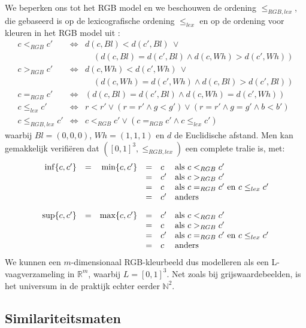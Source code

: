We beperken ons tot het RGB model en we beschouwen de ordening $\leq_{RGB,lex}$, die
gebaseerd is op de lexicografische ordening $\leq_{lex}$ en op de ordening voor kleuren in het 
RGB model uit \cite{dewitte:vect_morph_ops}:
$$
\begin{array}{rcl}
c <_{RGB} c' & \iff & d(c,Bl) < d(c',Bl)\ \lor \\
			   &	  & \quad(d(c,Bl) = d(c',Bl) \land d(c,Wh) > d(c',Wh)) \\[5pt]
c >_{RGB} c' & \iff & d(c,Wh) < d(c',Wh)\ \lor \\
			   &	  & \quad(d(c,Wh) = d(c',Wh) \land d(c,Bl) > d(c',Bl)) \\[5pt]
c =_{RGB} c'   & \iff & (d(c,Bl) = d(c',Bl) \land d(c,Wh) = d(c',Wh)) \\[10pt]
c \leq_{lex} c' & \iff & r < r' \lor (r = r' \land g < g') \lor (r = r' \land g = g' \land b < b') \\[10pt]
c \leq_{RGB,lex} c' & \iff & c <_{RGB} c' \lor (c =_{RGB} c' \land c \leq_{lex} c')
\end{array}
$$
waarbij $Bl = (0,0,0)$, $Wh = (1,1,1)$ en $d$ de Euclidische afstand.
Men kan gemakkelijk verifi\"eren dat $([0,1]^3,\leq_{RGB,lex})$ een complete tralie is, met:
$$
\begin{array}{@{}c@{}}
\begin{array}{rcrcll}
\inf \{c,c'\} & = & \min \{c,c'\} & = & c & \textrm{als } c <_{RGB} c' \\
		  	& & & = & c' & \textrm{als } c >_{RGB} c' \\
		  	& & & = & c & \textrm{als } c =_{RGB} c' \textrm{ en } c \leq_{lex} c' \\
		  	& & & = & c' & \textrm{anders} \\[10pt]
\sup \{c,c'\} & = & \max \{c,c'\} & = & c' & \textrm{als } c <_{RGB} c' \\
		  	& & & = & c & \textrm{als } c >_{RGB} c' \\
		  	& & & = & c' & \textrm{als } c =_{RGB} c' \textrm{ en } c \leq_{lex} c' \\
		  	& & & = & c & \textrm{anders}
\end{array}
\end{array}
$$
We kunnen een $m$-dimensionaal RGB-kleurbeeld dus modelleren als een L-vaagverzameling in 
$\mathbb{R}^m$, waarbij $L=[0,1]^3$. Net zoals bij grijswaardebeelden, is 
het universum in de praktijk echter eerder $\mathbb{N}^2$.

\subsection{Similariteitsmaten}

